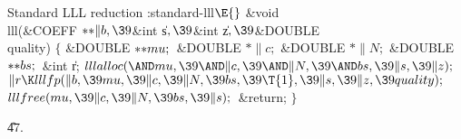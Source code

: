 Standard LLL reduction
\Y\B\4:standard-lll\X${}\E{}$\6
\&{void} \\{lll}(\&{COEFF} ${}{*}{*}\|b,\39{}$\&{int} \|s${},\39{}$\&{int} %
\|z${},\39{}$\&{DOUBLE} \\{quality})\1\1\2\2\6
${}\{{}$\1\6
\&{DOUBLE} ${}{*}{*}\\{mu};{}$\6
\&{DOUBLE} ${}{*}\|c;{}$\6
\&{DOUBLE} ${}{*}\|N;{}$\6
\&{DOUBLE} ${}{*}{*}\\{bs};{}$\6
\&{int} \|r;\7
${}\\{lllalloc}({\AND}\\{mu},\39{\AND}\|c,\39{\AND}\|N,\39{\AND}\\{bs},\39\|s,%
\39\|z);{}$\6
${}\|r\K\\{lllfp}(\|b,\39\\{mu},\39\|c,\39\|N,\39\\{bs},\39\T{1},\39\|s,\39\|z,%
\39\\{quality});{}$\6
${}\\{lllfree}(\\{mu},\39\|c,\39\|N,\39\\{bs},\39\|s);{}$\6
\&{return};\6
\4${}\}{}$\2\par
\U47.\fi


